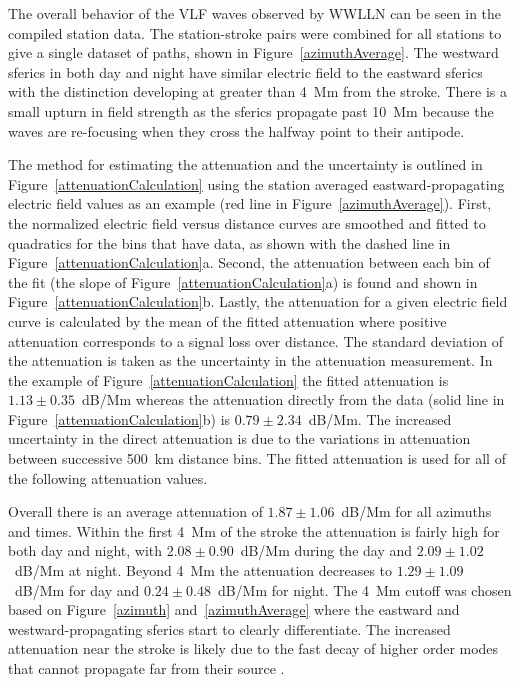 \documentclass[draft,jgrga]{AGUTeX}
\begin{document}
\begin{article}
The overall behavior of the VLF waves observed by WWLLN can be seen in the compiled station data.
The station-stroke pairs were combined for all stations to give a single dataset of paths, shown in Figure~\ref{azimuthAverage}.
The westward sferics in both day and night have similar electric field to the eastward sferics with the distinction developing at greater than 4~Mm from the stroke.
There is a small upturn in field strength as the sferics propagate past 10~Mm because the waves are re-focusing when they cross the halfway point to their antipode.

The method for estimating the attenuation and the uncertainty is outlined in Figure~\ref{attenuationCalculation} using the station averaged eastward-propagating electric field values as an example (red line in Figure~\ref{azimuthAverage}).
First, the normalized electric field versus distance curves are smoothed and fitted to quadratics for the bins that have data, as shown with the dashed line in Figure~\ref{attenuationCalculation}a.
Second, the attenuation between each bin of the fit (the slope of Figure~\ref{attenuationCalculation}a) is found and shown in Figure~\ref{attenuationCalculation}b.
Lastly, the attenuation for a given electric field curve is calculated by the mean of the fitted attenuation where positive attenuation corresponds to a signal loss over distance.
The standard deviation of the attenuation is taken as the uncertainty in the attenuation measurement.
In the example of Figure~\ref{attenuationCalculation} the fitted attenuation is $1.13\pm0.35$~dB/Mm whereas the attenuation directly from the data (solid line in Figure~\ref{attenuationCalculation}b) is $0.79\pm2.34$~dB/Mm.
The increased uncertainty in the direct attenuation is due to the variations in attenuation between successive 500~km distance bins.
The fitted attenuation is used for all of the following attenuation values.

Overall there is an average attenuation of $1.87\pm1.06$~dB/Mm for all azimuths and times.
Within the first 4~Mm of the stroke the attenuation is fairly high for both day and night, with $2.08\pm0.90$~dB/Mm during the day and $2.09\pm1.02$~dB/Mm at night.
Beyond 4~Mm the attenuation decreases to $1.29\pm1.09$~dB/Mm for day and $0.24\pm0.48$~dB/Mm for night.
The 4~Mm cutoff was chosen based on Figure~\ref{azimuth} and~\ref{azimuthAverage} where the eastward and westward-propagating sferics start to clearly differentiate.
The increased attenuation near the stroke is likely due to the fast decay of higher order modes that cannot propagate far from their source \citep{Wait1970}.


\end{article}
\end{document}
